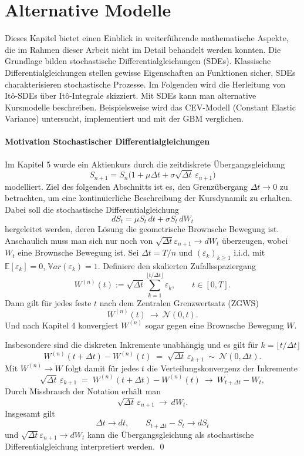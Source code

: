 \section{Alternative Modelle}

Dieses Kapitel bietet einen Einblick in weiterführende mathematische Aspekte, die im Rahmen dieser Arbeit nicht im Detail behandelt werden konnten.
Die Grundlage bilden stochastische Differentialgleichungen (SDEs). Klassische Differentialgleichungen stellen gewisse
Eigenschaften an Funktionen sicher, SDEs charakterisieren stochastische Prozesse. Im Folgenden wird die Herleitung von It\^o-SDEs über It\^o-Integrale skizziert. 
Mit SDEs kann man alternative Kursmodelle beschreiben. Beispielsweise wird das CEV-Modell (Constant Elastic Variance) untersucht, implementiert
und mit der GBM verglichen.

\paragraph{Motivation Stochastischer Differentialgleichungen}

Im Kapitel 5 wurde ein Aktienkurs durch die zeitdiskrete Übergangsgleichung
$$S_{n+1} = S_n \big(1 + \mu \Delta t + \sigma \sqrt{\Delta t}\,\varepsilon_{n+1}\big)$$
modelliert. Ziel des folgenden Abschnitts ist es, den Grenzübergang $\Delta t \to 0$ zu betrachten,
um eine kontinuierliche Beschreibung der Kursdynamik zu erhalten. Dabei soll die stochastische Differentialgleichung
$$dS_t = \mu S_t\,dt + \sigma S_t\,dW_t$$
hergeleitet werden, deren Lösung die geometrische Brownsche Bewegung ist. 
Anschaulich muss man sich nur noch von $\sqrt{\Delta t} \varepsilon_{n+1} \to dW_t$ überzeugen, wobei $W_t$ eine Brownsche Bewegung ist.
Sei $\Delta t = T/n$ und $(\varepsilon_k)_{k\ge 1}$ i.i.d. mit $\mathbb E[\varepsilon_k]=0$, $\mathbb Var(\varepsilon_k)=1$.
Definiere den skalierten Zufallsspaziergang
$$
W^{(n)}(t) := \sqrt{\Delta t}\sum_{k=1}^{\lfloor t/\Delta t\rfloor}\varepsilon_k,\qquad t\in[0,T].
$$
Dann gilt für jedes feste $t$ nach dem Zentralen Grenzwertsatz (ZGWS)
$$
W^{(n)}(t)\ \to\ \mathcal N(0,t).
$$
Und nach Kapitel 4 konvergiert $W^{(n)}$ sogar gegen eine Brownsche Bewegung $W$.

Insbesondere sind die diskreten Inkremente unabhängig und es gilt für $k=\lfloor t/\Delta t\rfloor$
$$
W^{(n)}(t+\Delta t)-W^{(n)}(t)\;=\;\sqrt{\Delta t}\,\varepsilon_{k+1}\ \sim\ \mathcal N(0,\Delta t).
$$
Mit $W^{(n)}\to W$ folgt damit für jedes $t$ die Verteilungskonvergenz der Inkremente
$$
\sqrt{\Delta t}\,\varepsilon_{k+1}
\;=\;W^{(n)}(t+\Delta t)-W^{(n)}(t)\ \to \ W_{t+\Delta t}-W_t,
$$
Durch Missbrauch der Notation erhält man
$$
\sqrt{\Delta t}\,\varepsilon_{n+1}\ \to\ dW_t.
$$
Insgesamt gilt
$$\Delta t \to dt, \qquad S_{t + \Delta t} - S_t \to dS_t$$
und $\sqrt{\Delta t} \varepsilon_{n+1} \to dW_t$
kann die Übergangsgleichung als stochastische Differentialgleichung interpretiert werden.
\qed

